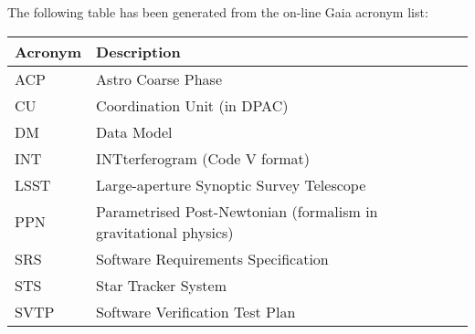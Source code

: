 The following table has been generated from the on-line Gaia acronym list:
\newline\newline%
\addtocounter{table}{-1}
\begin{longtable}{|l|p{}|}\hline 
\textbf{Acronym} & \textbf{Description}  \\\hline
ACP&Astro Coarse Phase \\\hline
CU&Coordination Unit (in DPAC) \\\hline
DM&Data Model \\\hline
INT&INTterferogram (Code V format) \\\hline
LSST&Large-aperture Synoptic Survey Telescope \\\hline
PPN&Parametrised Post-Newtonian (formalism in gravitational physics) \\\hline
SRS&Software Requirements Specification \\\hline
STS&Star Tracker System \\\hline
SVTP&Software Verification Test Plan \\\hline
\end{longtable} 
